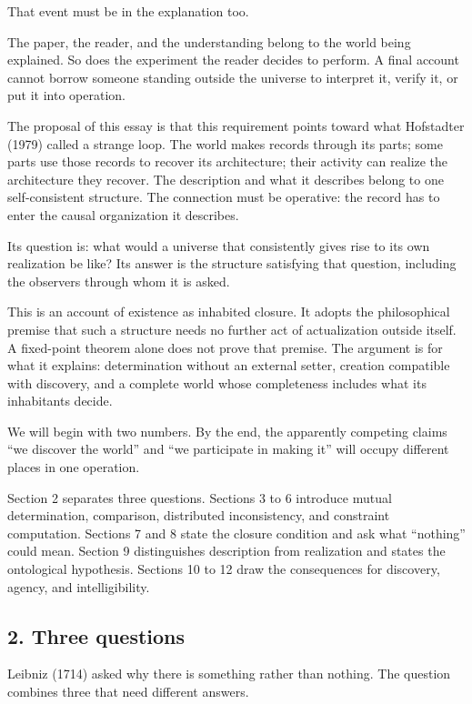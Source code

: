 \documentclass[
  11pt,
]{article}
\begin{document}
That event must be in the explanation too.

The paper, the reader, and the understanding belong to the world being
explained. So does the experiment the reader decides to perform. A final
account cannot borrow someone standing outside the universe to interpret
it, verify it, or put it into operation.

The proposal of this essay is that this requirement points toward what
Hofstadter (1979) called a strange loop. The world makes records through
its parts; some parts use those records to recover its architecture;
their activity can realize the architecture they recover. The
description and what it describes belong to one self-consistent
structure. The connection must be operative: the record has to enter the
causal organization it describes.

Its question is: what would a universe that consistently gives rise to
its own realization be like? Its answer is the structure satisfying that
question, including the observers through whom it is asked.

This is an account of existence as inhabited closure. It adopts the
philosophical premise that such a structure needs no further act of
actualization outside itself. A fixed-point theorem alone does not prove
that premise. The argument is for what it explains: determination
without an external setter, creation compatible with discovery, and a
complete world whose completeness includes what its inhabitants decide.

We will begin with two numbers. By the end, the apparently competing
claims ``we discover the world'' and ``we participate in making it''
will occupy different places in one operation.

Section 2 separates three questions. Sections 3 to 6 introduce mutual
determination, comparison, distributed inconsistency, and constraint
computation. Sections 7 and 8 state the closure condition and ask what
``nothing'' could mean. Section 9 distinguishes description from
realization and states the ontological hypothesis. Sections 10 to 12
draw the consequences for discovery, agency, and intelligibility.

\subsection{2. Three questions}\label{three-questions}

Leibniz (1714) asked why there is something rather than nothing. The
question combines three that need different answers.
\end{document}
